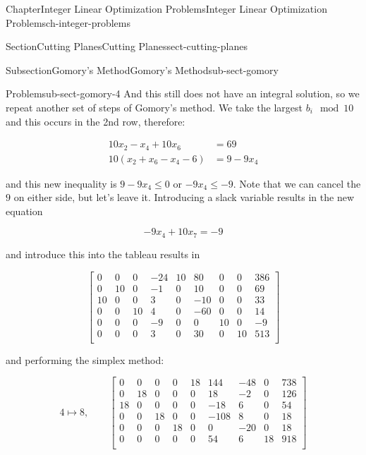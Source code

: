 \documentclass[oneside,10pt,]{book}
\numberwithin{equation}{section}
\newcommand{\amp}{&}
\begin{document}
\begin{chapterptx}{Chapter}{Integer Linear Optimization Problems}{}{Integer Linear Optimization Problems}{}{}{ch-integer-problems}
\begin{sectionptx}{Section}{Cutting Planes}{}{Cutting Planes}{}{}{sect-cutting-planes}
\begin{subsectionptx}{Subsection}{Gomory's Method}{}{Gomory's Method}{}{}{sub-sect-gomory}
\begin{problem}{Problem}{}{sub-sect-gomory-4}
And this still does not have an integral solution, so we repeat another set of steps of Gomory's method. We take the largest \(b_i \mod 10\) and this occurs in the 2nd row, therefore:%
\par
%
\begin{align*}
10x_2 - x_4 + 10x_6 \amp = 69 \\
10 (x_2 + x_6 - x_4-6)  \amp = 9 - 9x_4
\end{align*}
%
\par
and this new inequality is \(9-9x_4 \leq 0\) or \(-9x_4 \leq -9\). Note that we can cancel the \(9\) on either side, but let's leave it. Introducing a slack variable results in the new equation%
\par
%
\begin{equation*}
-9x_4 + 10 x_7 = -9
\end{equation*}
%
\par
and introduce this into the tableau results in%
\par
%
\begin{equation*}
\left[\begin{array}{rr|rrrrrr|r} 0 \amp 0 \amp 0 \amp -24 \amp 10 \amp 80 \amp 0 \amp 0 \amp 386\\ 0 \amp 10 \amp 0 \amp -1 \amp 0 \amp 10 \amp 0 \amp 0 \amp 69\\ 10 \amp 0 \amp 0 \amp 3 \amp 0 \amp -10 \amp 0 \amp 0 \amp 33\\ 0 \amp 0 \amp 10 \amp 4 \amp 0 \amp -60 \amp 0 \amp 0 \amp 14\\ 0 \amp 0 \amp 0 \amp -9 \amp 0 \amp 0 \amp 10 \amp 0 \amp -9\\ \hline 0 \amp 0 \amp 0 \amp 3 \amp 0 \amp 30 \amp 0 \amp 10 \amp 513\\ \end{array} \right]
\end{equation*}
%
\par
and performing the simplex method:%
\par
%
\begin{equation*}
4 \mapsto 8, \qquad \left[\begin{array}{rr|rrrrrr|r} 0 \amp 0 \amp 0 \amp 0 \amp 18 \amp 144 \amp -48 \amp 0 \amp 738\\ 0 \amp 18 \amp 0 \amp 0 \amp 0 \amp 18 \amp -2 \amp 0 \amp 126\\ 18 \amp 0 \amp 0 \amp 0 \amp 0 \amp -18 \amp 6 \amp 0 \amp 54\\ 0 \amp 0 \amp 18 \amp 0 \amp 0 \amp -108 \amp 8 \amp 0 \amp 18\\ 0 \amp 0 \amp 0 \amp 18 \amp 0 \amp 0 \amp -20 \amp 0 \amp 18\\ \hline 0 \amp 0 \amp 0 \amp 0 \amp 0 \amp 54 \amp 6 \amp 18 \amp 918\\ \end{array} \right]

\end{equation*}
\end{problem}
\end{subsectionptx}
\end{sectionptx}
\end{chapterptx}
\end{document}
